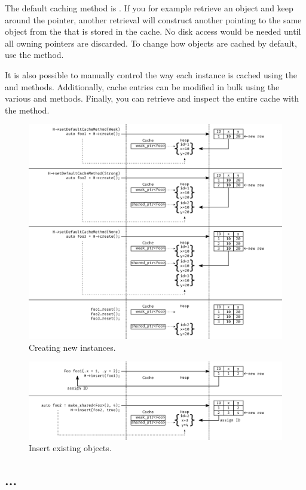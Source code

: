 The default caching method is . If you for example retrieve an object and keep around the pointer, another retrieval will construct another  pointing to the same object from the  that is stored in the cache. No disk access would be needed until all owning pointers are discarded. To change how objects are cached by default, use the  method.

It is also possible to manually control the way each instance is cached using the  and  methods. Additionally, cache entries can be modified in bulk using the various  and  methods. Finally, you can retrieve and inspect the entire cache with the  method.

\begin{figure}[H]
	\includegraphics[width=1\textwidth]{figures/create.pdf}
	\caption{Creating new instances.}\label{fig:object_handler:create}
\end{figure}

\begin{figure}[H]
	\includegraphics[width=1\textwidth]{figures/insert.pdf}
	\caption{Insert existing objects.}\label{fig:object_handler:insert}
\end{figure}

\subsection{...}

